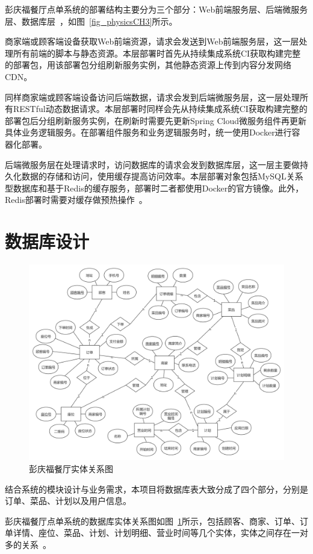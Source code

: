 彭庆福餐厅点单系统的部署结构主要分为三个部分：Web前端服务层、后端微服务层、数据库层~\cite{syp2018}，如图~\ref{fig_physicsCH3}所示。

商家端或顾客端设备获取Web前端资源，请求会发送到Web前端服务层，这一层处理所有前端的脚本与静态资源。本层部署时首先从持续集成系统CI获取构建完整的部署包，用该部署包分组刷新服务实例，其他静态资源上传到内容分发网络CDN。

同样商家端或顾客端设备访问后端数据，请求会发到后端微服务层，这一层处理所有RESTful动态数据请求。本层部署时同样会先从持续集成系统CI获取构建完整的部署包后分组刷新服务实例，在刷新时需要先更新Spring Cloud微服务组件再更新具体业务逻辑服务。在部署组件服务和业务逻辑服务时，统一使用Docker进行容器化部署。

后端微服务层在处理请求时，访问数据库的请求会发到数据库层，这一层主要做持久化数据的存储和访问，使用缓存提高访问效率。本层部署对象包括MySQL关系型数据库和基于Redis的缓存服务，部署时二者都使用Docker的官方镜像。此外，Redis部署时需要对缓存做预热操作~\cite{wxl}。

\section{数据库设计}
\begin{figure}[htbp!]
  \centering
  \includegraphics[width=5in]{FIGs/chapter3/ER.pdf}
  \caption{彭庆福餐厅实体关系图}\label{fig_ERCH3}
\end{figure}

结合系统的模块设计与业务需求，本项目将数据库表大致分成了四个部分，分别是订单、菜品、计划以及用户信息。

彭庆福餐厅点单系统的数据库实体关系图如图~\ref{fig_ERCH3}所示，包括顾客、商家、订单、订单详情、座位、菜品、计划、计划明细、营业时间等几个实体，实体之间存在一对多的关系~\cite{xjfMySQL}。

